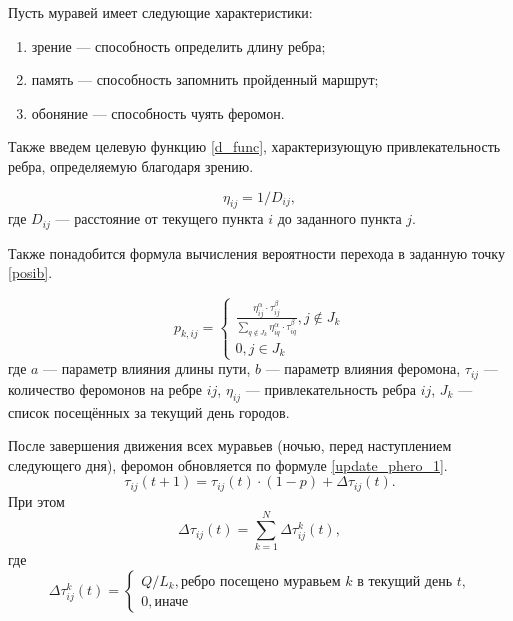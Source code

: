 Пусть муравей имеет следующие характеристики:
\begin{enumerate}[label=\arabic*)]
	\item зрение --- способность определить длину ребра;
	\item память --- способность запомнить пройденный маршрут;
	\item обоняние --- способность чуять феромон.
\end{enumerate}


Также введем целевую функцию \eqref{d_func}, характеризующую привлекательность ребра, определяемую благодаря зрению.

\begin{equation}
	\label{d_func}
	\eta_{ij} = 1 / D_{ij},
\end{equation}
где $D_{ij}$ — расстояние от текущего пункта $i$ до заданного пункта $j$.


Также понадобится формула вычисления вероятности перехода в заданную точку \eqref{posib}.

\begin{equation}
	\label{posib}
	p_{k,ij} = \begin{cases}
		\frac{\eta_{ij}^{\alpha}\cdot\tau_{ij}^{\beta}}{\sum_{q\notin J_k} \eta^\alpha_{iq}\cdot\tau^\beta_{iq}}, j \notin J_k \\
		0, j \in J_k
	\end{cases}
\end{equation}
где $a$ --- параметр влияния длины пути, $b$ --- параметр влияния феромона, $\tau_{ij}$ --- количество феромонов на ребре $ij$, $\eta_{ij}$ --- привлекательность ребра $ij$, $J_k$ --- список посещённых за текущий день городов.

После завершения движения всех муравьев (ночью, перед наступлением следующего дня), феромон обновляется по формуле \eqref{update_phero_1}.
\begin{equation}
	\label{update_phero_1}
	\tau_{ij}(t+1) = \tau_{ij}(t)\cdot(1-p) + \Delta \tau_{ij}(t).
\end{equation}
При этом
\begin{equation}
	\label{update_phero_2}
	\Delta \tau_{ij}(t) = \sum_{k=1}^N \Delta \tau^k_{ij}(t),
\end{equation}
где
\begin{equation}
	\label{update_phero_3}
	\Delta\tau^k_{ij}(t) = \begin{cases}
		Q/L_{k}, \textrm{ребро посещено муравьем $k$ в текущий день $t$,} \\
		0, \textrm{иначе}
	\end{cases}
\end{equation}

